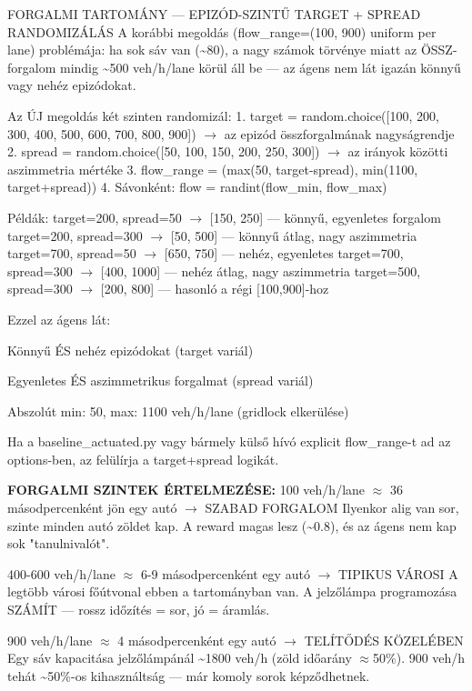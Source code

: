 \documentclass[11pt,a4paper]{article}
\begin{document}
FORGALMI TARTOMÁNY — EPIZÓD-SZINTŰ TARGET + SPREAD RANDOMIZÁLÁS
A korábbi megoldás (flow\_range=(100, 900) uniform per lane) problémája:
ha sok sáv van (\textasciitilde{}80), a nagy számok törvénye miatt az ÖSSZ-forgalom
mindig \textasciitilde{}500 veh/h/lane körül áll be — az ágens nem lát igazán könnyű
vagy nehéz epizódokat.

Az ÚJ megoldás két szinten randomizál:
1. target = random.choice([100, 200, 300, 400, 500, 600, 700, 800, 900])
$\rightarrow$ az epizód összforgalmának nagyságrendje
2. spread = random.choice([50, 100, 150, 200, 250, 300])
$\rightarrow$ az irányok közötti aszimmetria mértéke
3. flow\_range = (max(50, target-spread), min(1100, target+spread))
4. Sávonként: flow = randint(flow\_min, flow\_max)

Példák:
target=200, spread=50  $\rightarrow$ [150, 250]  — könnyű, egyenletes forgalom
target=200, spread=300 $\rightarrow$ [50, 500]   — könnyű átlag, nagy aszimmetria
target=700, spread=50  $\rightarrow$ [650, 750]  — nehéz, egyenletes
target=700, spread=300 $\rightarrow$ [400, 1000] — nehéz átlag, nagy aszimmetria
target=500, spread=300 $\rightarrow$ [200, 800]  — hasonló a régi [100,900]-hoz

Ezzel az ágens lát:
\par\noindent\hspace*{1em}\textbullet{} Könnyű ÉS nehéz epizódokat (target variál)
\par\noindent\hspace*{1em}\textbullet{} Egyenletes ÉS aszimmetrikus forgalmat (spread variál)
\par\noindent\hspace*{1em}\textbullet{} Abszolút min: 50, max: 1100 veh/h/lane (gridlock elkerülése)

Ha a baseline\_actuated.py vagy bármely külső hívó explicit flow\_range-t
ad az options-ben, az felülírja a target+spread logikát.

\textbf{FORGALMI SZINTEK ÉRTELMEZÉSE:}
100 veh/h/lane $\approx$ 36 másodpercenként jön egy autó $\rightarrow$ SZABAD FORGALOM
Ilyenkor alig van sor, szinte minden autó zöldet kap.
A reward magas lesz (\textasciitilde{}0.8), és az ágens nem kap sok "tanulnivalót".

400-600 veh/h/lane $\approx$ 6-9 másodpercenként egy autó $\rightarrow$ TIPIKUS VÁROSI
A legtöbb városi főútvonal ebben a tartományban van.
A jelzőlámpa programozása SZÁMÍT — rossz időzítés = sor, jó = áramlás.

900 veh/h/lane $\approx$ 4 másodpercenként egy autó $\rightarrow$ TELÍTŐDÉS KÖZELÉBEN
Egy sáv kapacitása jelzőlámpánál \textasciitilde{}1800 veh/h (zöld időarány $\approx$50\%).
900 veh/h tehát \textasciitilde{}50\%-os kihasználtság — már komoly sorok képződhetnek.
\end{document}
